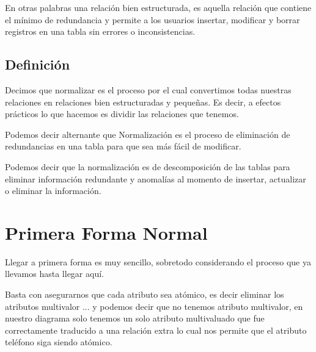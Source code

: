 \documentclass[12pt, fleqn]{report}                             %
\theoremstyle{break}                                            %
\begin{document}
        En otras palabras una relación bien estructurada, es aquella relación que contiene el
        mínimo de redundancia y permite a los usuarios insertar, modificar y borrar registros
        en una tabla sin errores o inconsistencias.

    \subsection{Definición}

        Decimos que normalizar es el proceso por el cual convertimos todas nuestras relaciones
        en relaciones bien estructuradas y pequeñas.
        Es decir, a efectos prácticos lo que hacemos es dividir las relaciones que tenemos.

        Podemos decir alternante que Normalización es el proceso de eliminación de
        redundancias en una tabla para que sea más fácil de modificar.

        Podemos decir que la normalización es de descomposición de las tablas para eliminar
        información redundante y anomalías al momento de insertar, actualizar o eliminar la
        información.


      \section{Primera Forma Normal}

        Llegar a primera forma es muy sencillo, sobretodo considerando el proceso 
        que ya llevamos hasta llegar aquí.

        Basta con asegurarnos que cada atributo sea atómico, es decir eliminar los atributos multivalor ...
        y podemos decir que no tenemos atributo multivalor, en nuestro diagrama solo tenemos un solo atributo multivaluado
        que fue correctamente traducido a una relación extra lo cual nos permite que el atributo teléfono siga siendo atómico.
\end{document}
